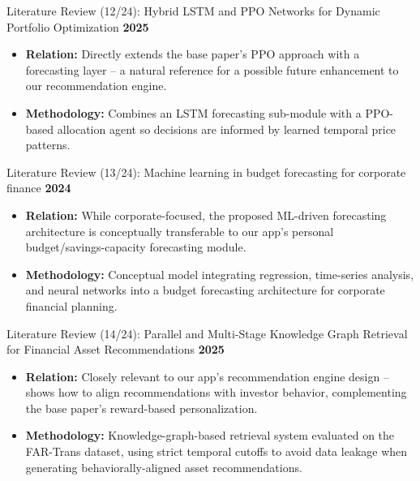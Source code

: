 \documentclass{beamer}
\begin{document}
\begin{frame}{Literature Review (12/24): Hybrid LSTM and PPO Networks for Dynamic Portfolio Optimization}
\small
\textbf{2025}
\begin{itemize}
    \item \textbf{Relation:} Directly extends the base paper's PPO approach with a forecasting layer -- a natural reference for a possible future enhancement to our recommendation engine.
    \item \textbf{Methodology:} Combines an LSTM forecasting sub-module with a PPO-based allocation agent so decisions are informed by learned temporal price patterns.
\end{itemize}
\end{frame}

\begin{frame}{Literature Review (13/24): Machine learning in budget forecasting for corporate finance}
\small
\textbf{2024}
\begin{itemize}
    \item \textbf{Relation:} While corporate-focused, the proposed ML-driven forecasting architecture is conceptually transferable to our app's personal budget/savings-capacity forecasting module.
    \item \textbf{Methodology:} Conceptual model integrating regression, time-series analysis, and neural networks into a budget forecasting architecture for corporate financial planning.
\end{itemize}
\end{frame}

\begin{frame}{Literature Review (14/24): Parallel and Multi-Stage Knowledge Graph Retrieval for Financial Asset Recommendations}
\small
\textbf{2025}
\begin{itemize}
    \item \textbf{Relation:} Closely relevant to our app's recommendation engine design -- shows how to align recommendations with investor behavior, complementing the base paper's reward-based personalization.
    \item \textbf{Methodology:} Knowledge-graph-based retrieval system evaluated on the FAR-Trans dataset, using strict temporal cutoffs to avoid data leakage when generating behaviorally-aligned asset recommendations.
\end{itemize}
\end{frame}
\end{document}
